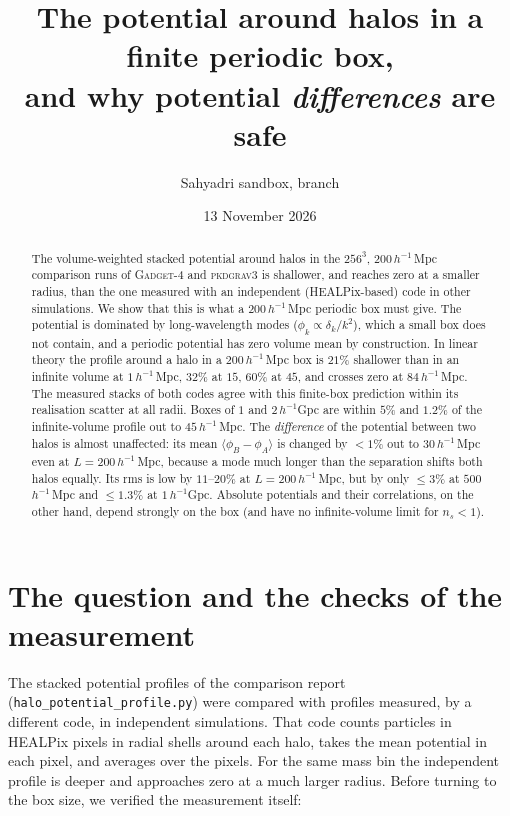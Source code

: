 \documentclass[11pt,a4paper]{article}
\title{The potential around halos in a finite periodic box,\\ and why potential \emph{differences} are safe}
\author{Sahyadri sandbox, branch \fp{rockstar-pkc-reader}\\
  \small\fp{reports/gadget_pkdgrav3_potential/box_size_note}}
\date{13 November 2026}
\newcommand{\pkd}{\textsc{pkdgrav3}}
\newcommand{\gad}{\textsc{Gadget-4}}
\newcommand{\fp}[1]{\nolinkurl{#1}}
\newcommand{\Mpch}{$h^{-1}$\,Mpc}
\begin{document}
\maketitle

\begin{abstract}
\noindent The volume-weighted stacked potential around halos in the $256^3$, $200$\,\Mpch{} comparison runs of \gad{} and \pkd{} is shallower, and reaches zero at a smaller radius, than the one measured with an independent (HEALPix-based)
code in other simulations. We show that this is what a $200$\,\Mpch{} periodic box must give. The potential is
dominated by long-wavelength modes ($\phi_k\propto\delta_k/k^2$), which a small box does not contain, and a periodic
potential has zero volume mean by construction. In linear theory the profile around a halo in a $200$\,\Mpch{} box is
$21\%$ shallower than in an infinite volume at $1$\,\Mpch, $32\%$ at $15$, $60\%$ at $45$, and crosses zero at
$84$\,\Mpch. The measured stacks of both codes agree with this finite-box prediction within its realisation scatter
at all radii. Boxes of $1$ and $2$\,$h^{-1}$Gpc are within $5\%$ and $1.2\%$ of the infinite-volume profile out to
$45$\,\Mpch. The \emph{difference} of the potential between two halos is almost unaffected: its mean
$\langle\phi_B-\phi_A\rangle$ is changed by $<1\%$ out to $30$\,\Mpch{} even at $L=200$\,\Mpch, because a mode much
longer than the separation shifts both halos equally. Its rms is low by $11$--$20\%$ at $L=200$\,\Mpch, but by only
$\le3\%$ at $500$\,\Mpch{} and $\le1.3\%$ at $1$\,$h^{-1}$Gpc. Absolute potentials and their correlations, on the
other hand, depend strongly on the box (and have no infinite-volume limit for $n_s<1$).
\end{abstract}

\tableofcontents

\section{The question and the checks of the measurement}
\label{sec:checks}

The stacked potential profiles of the comparison report (\fp{halo_potential_profile.py}) were compared with profiles
measured, by a different code, in independent simulations. That code counts particles in HEALPix pixels in radial
shells around each halo, takes the mean potential in each pixel, and averages over the pixels. For the same mass bin
the independent profile is deeper and approaches zero at a much larger radius. Before turning to the box size, we
verified the measurement itself:
\end{document}
